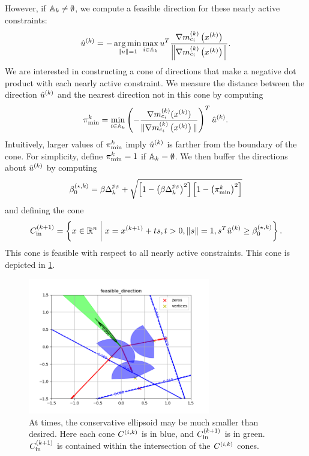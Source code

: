 However, if ${\mathbb A_{k}} \ne \emptyset$, we compute a feasible direction for these nearly active constraints:
\begin{align}
{{\hat u}^{(k)}} = -\operatorname*{arg\,min}_{\|u\| = 1} \max_{i \in {\mathbb A_{k}}} u^T \frac{{\nabla m_{c_i}^{(k)}\left(x^{(k)}\right)}}{\left\|{\nabla m_{c_i}^{(k)}\left(x^{(k)}\right)}\right\|}. \label{define_u}
\end{align}
We are interested in constructing a cone of directions that make a negative dot product with each nearly active constraint.
We measure the distance between the direction ${{\hat u}^{(k)}}$ and the nearest direction not in this cone by computing
\begin{align}
{\pi^k_{\textrm{min}}} = \min_{i \in {\mathbb A_{k}}} \left(-{\frac{\nabla m^{(k)}_{c_i}(x^{(k)})}{\|\nabla m^{(k)}_{c_i}\left(x^{(k)}\right)\|}}\right)^T {{\hat u}^{(k)}} \label{define_thetamink}.
\end{align}
Intuitively, larger values of ${\pi^k_{\textrm{min}}}$ imply ${{\hat u}^{(k)}}$ is farther from the boundary of the cone.
For simplicity, define ${\pi^k_{\textrm{min}}} = 1$ if ${\mathbb A_{k}} = \emptyset$.
We then buffer the directions about ${{\hat u}^{(k)}}$ by computing
\begin{align}
{\beta_0^{(\star, k)}} = \beta\Delta_k^{p_{\beta}} + \sqrt{\left[1 - \left(\beta\Delta_k^{p_{\beta}}\right)^2\right]\left[1 - \left({\pi^k_{\textrm{min}}}\right) ^2\right]} \label{define_bsk}
\end{align}
and defining the cone
\begin{align}
{C^{(k+1)}_{\textrm{in}}} = \left\{x \in \mathbb R^n \; \bigg| \; x = {{x}^{(k+1)}} + ts, t > 0, \|s\| = 1, s^T{{\hat u}^{(k)}} \ge {\beta_0^{(\star, k)}} \right\}. \label{define_inner_cone}
\end{align}
This cone is feasible with respect to all nearly active constraints.
This cone is depicted in \cref{feasible_direction}.
\begin{figure}[ht]
    \centering
    \includegraphics[width=300px]{images/feasible_direction.png}
    \caption{
    	At times, the conservative ellipsoid may be much smaller than desired.
    	Here each cone ${C^{(i, k)}}$ is in blue, and ${C^{(k+1)}_{\textrm{in}}}$ is in green.
    	${C^{(k+1)}_{\textrm{in}}}$ is contained within the intersection of the ${C^{(i, k)}}$ cones.
	}
    \label{feasible_direction}
\end{figure}

